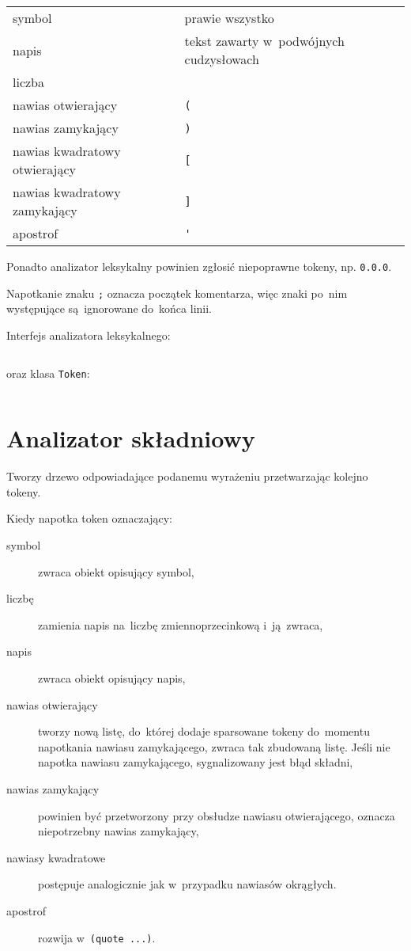 \documentclass[a4paper,11pt]{article}
\newcommand{\impl}[1]{\inputminted[fontsize=\footnotesize]{java}{impl/#1.java}}
\begin{document}
\begin{table}[H]
  \centering
  \begin{tabular}{|p{6cm} p{6cm}|} \hline
    symbol & prawie wszystko \\
    napis & tekst zawarty w~podwójnych cudzysłowach \\ 
    liczba & \\ \hline
    nawias otwierający & \verb+(+ \\
    nawias zamykający & \verb+)+ \\ \hline
    nawias kwadratowy otwierający & \verb+[+ \\
    nawias kwadratowy zamykający & \verb+]+ \\ \hline
    apostrof & \verb+'+ \\ \hline
  \end{tabular}
\end{table}

Ponadto analizator leksykalny powinien zgłosić niepoprawne tokeny, np.
\verb+0.0.0+.

Napotkanie znaku \verb+;+ oznacza początek komentarza, więc znaki po~nim
występujące są~ignorowane do~końca linii.

Interfejs analizatora leksykalnego:
\impl{Lexer}

oraz klasa \verb+Token+:
\impl{Token}

\section{Analizator składniowy}

Tworzy drzewo odpowiadające podanemu wyrażeniu przetwarzając kolejno tokeny.

Kiedy napotka token oznaczający:
\begin{description}
\item[symbol] zwraca obiekt opisujący symbol,
\item[liczbę] zamienia napis na~liczbę zmiennoprzecinkową i~ją~zwraca,
\item[napis] zwraca obiekt opisujący napis,
\item[nawias otwierający] tworzy nową listę, do~której dodaje sparsowane tokeny
  do~momentu napotkania nawiasu zamykającego, zwraca tak zbudowaną listę. Jeśli
  nie napotka nawiasu zamykającego, sygnalizowany jest błąd składni,
\item[nawias zamykający] powinien być przetworzony przy obsłudze nawiasu
  otwierającego, oznacza niepotrzebny nawias zamykający,
\item[nawiasy kwadratowe] postępuje analogicznie jak w~przypadku nawiasów
  okrągłych.
\item[apostrof] rozwija w~\verb+(quote ...)+.
\end{description}
\end{document}
